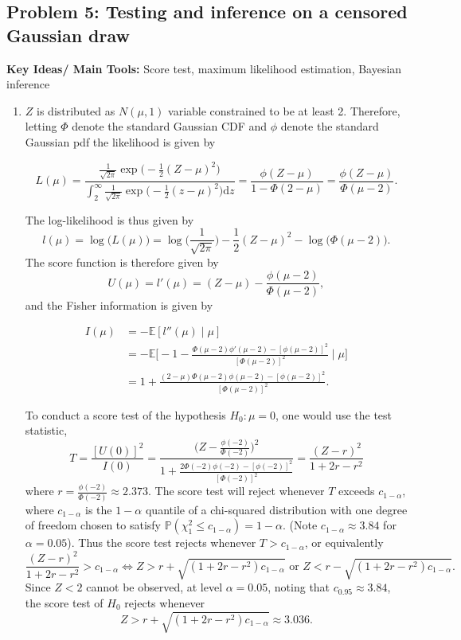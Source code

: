 \subsection*{Problem 5: Testing and inference on a censored Gaussian draw}

\textbf{Key Ideas/ Main Tools:} Score test, maximum likelihood estimation, Bayesian inference

\begin{enumerate}[label=(\alph*)]
\item $Z$ is distributed as $N(\mu,1)$ variable constrained to be at least 2. Therefore, letting $\Phi$ denote the standard Gaussian CDF and $\phi$ denote the standard Gaussian pdf the likelihood is given by 

$$L(\mu)  = \frac{\frac{1}{\sqrt{2 \pi} } \exp \big( -\frac{1}{2} (Z- \mu)^2 \big)}{\int_{2}^{\infty} \frac{1}{\sqrt{2 \pi} } \exp \big( -\frac{1}{2} (z- \mu)^2 \big) \text{d}z} = \frac{\phi(Z-\mu)}{1- \Phi(2-\mu)} = \frac{\phi(Z-\mu)}{\Phi(\mu-2)}.$$

The log-likelihood is thus given by $$l(\mu) = \log \big( L(\mu) \big) = \log \big( \frac{1}{\sqrt{2 \pi}} \big) -\frac{1}{2} (Z- \mu)^2  - \log \big( \Phi(\mu-2) \big).$$
The score function is therefore given by $$U(\mu) =l'(\mu) = (Z-\mu) - \frac{\phi(\mu-2)}{\Phi(\mu-2)},$$ and the Fisher information is given by 

$$\begin{aligned} I(\mu) & = -\mathbb{E}[l''(\mu) \mid \mu] \\ & = -\mathbb{E} \Big[ -1  - \frac{\Phi(\mu-2) \phi'(\mu-2)-[\phi(\mu-2)]^2}{[\Phi(\mu-2)]^2 } \mid \mu \Big] \\ & =1+\frac{(2-\mu) \Phi(\mu-2) \phi(\mu-2)-[\phi(\mu-2)]^2}{[\Phi(\mu-2)]^2}.
\end{aligned}$$

To conduct a score test of the hypothesis $H_0: \mu=0$, one would use the test statistic, $$T= \frac{[U(0)]^2}{I(0)} = \frac{\big( Z - \frac{\phi(-2)}{\Phi(-2)} \big)^2}{1+\frac{2 \Phi(-2) \phi(-2)-[\phi(-2)]^2}{[\Phi(-2)]^2}}= \frac{(Z-r)^2}{1+2r-r^2}$$
where $r=\frac{\phi(-2)}{\Phi(-2)} \approx 2.373.$ The score test will reject whenever $T$ exceeds $c_{1-\alpha}$, where $c_{1-\alpha}$ is the $1-\alpha$ quantile of a chi-squared distribution with one degree of freedom chosen to satisfy $\mathbb{P}(\chi_1^2 \leq c_{1-\alpha} )=1-\alpha$. (Note $c_{1-\alpha} \approx 3.84$ for $\alpha=0.05$). Thus the score test rejects whenever $T> c_{1-\alpha}$, or equivalently   
\[
    \frac{(Z-r)^2}{1+2r-r^2} >  c_{1-\alpha} \Leftrightarrow  Z > r+ \sqrt{(1+2r-r^2) c_{1-\alpha}}  \text { or } Z<  r- \sqrt{(1+2r-r^2) c_{1-\alpha}}.
\]
Since $Z< 2$ cannot be observed, at level $\alpha=0.05$, noting that $c_{0.95} \approx 3.84$, the score test of $H_0$ rejects whenever $$Z > r+ \sqrt{(1+2r-r^2) c_{1-\alpha}} \approx 3.036.$$



\end{enumerate}
